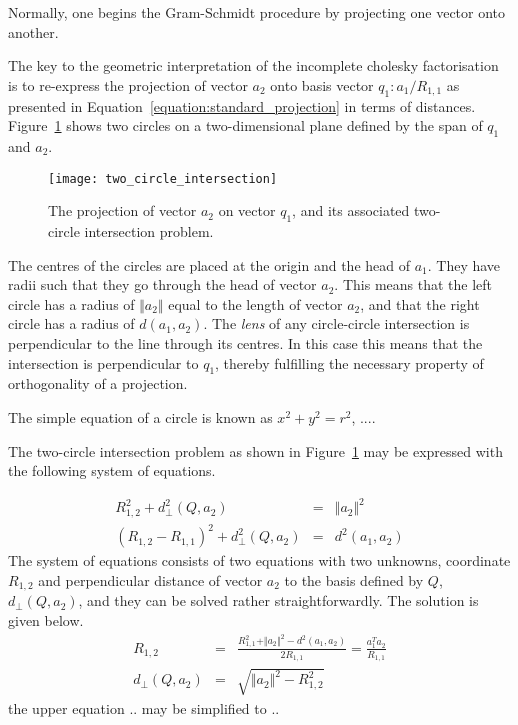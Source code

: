 \documentclass{article}
\newcommand{\sv}{Q}
\newcommand{\sve}{q}
\newcommand{\nonsve}{a}
\newcommand{\ce}{R}
\begin{document}
Normally, one begins the Gram-Schmidt procedure by projecting one
vector onto another. 

The key to the geometric interpretation of the incomplete
cholesky factorisation is to re-express the projection
of vector $\nonsve_{2}$ onto basis vector $\sve_{1}:\nonsve_{1}/\ce_{1,1}$
as presented in Equation~\ref{equation:standard_projection} in terms
of distances. Figure~\ref{figure:two_circle_intersection} shows two circles
on a two-dimensional plane defined by the span of $\sve_{1}$ and
$\nonsve_{2}$. %
\begin{figure}
\begin{center}
\texttt{[image: two\_circle\_intersection]}
\end{center}
\caption{The projection of vector $\nonsve_{2}$ on vector $\sve_{1}$, and
its associated two-circle intersection problem.%
\label{figure:two_circle_intersection}}
\end{figure}
%
The centres of the circles are placed at the origin and the head
of $\nonsve_{1}$. They have radii such that they go through the head
of vector $\nonsve_{2}$. This means that the left circle has a radius
of $\Vert\nonsve_{2}\Vert$ equal to the length of vector $\nonsve_{2}$,
and that the right circle has a radius of $d(\nonsve_{1},\nonsve_{2})$.
The \emph{lens} of any circle-circle intersection is perpendicular
to the line through its centres. In this case this means that the
intersection is perpendicular to $\sve_{1}$, thereby fulfilling the
necessary property of orthogonality of a projection. 

The simple equation of a circle is known as $x^{2}+y^{2}=r^{2}$,
.... 

The two-circle intersection problem as shown in Figure~\ref{figure:two_circle_intersection}
may be expressed with the following system of equations. 

\begin{eqnarray*}
\ce_{1,2}^{2}+d_{\perp}^{2}(\sv,\nonsve_{2}) & = & \Vert\nonsve_{2}\Vert^{2}\\
(\ce_{1,2}-\ce_{1,1})^{2}+d_{\perp}^{2}(\sv,\nonsve_{2}) & = & d^{2}(\nonsve_{1},\nonsve_{2})\end{eqnarray*}
The system of equations consists of two equations with two unknowns,
coordinate $\ce_{1,2}$ and perpendicular distance of vector $\nonsve_{2}$
to the basis defined by $\sv$, $d_{\perp}(\sv,\nonsve_{2})$, and
they can be solved rather straightforwardly. The solution is given
below. \begin{eqnarray*}
\ce_{1,2} & = & \frac{\ce_{1,1}^{2}+\Vert\nonsve_{2}\Vert^{2}-d^{2}(\nonsve_{1},\nonsve_{2})}{2\ce_{1,1}}=\frac{\nonsve_{1}^{T}\nonsve_{2}}{\ce_{1,1}}\\
d_{\perp}(\sv,\nonsve_{2}) & = & \sqrt{\Vert\nonsve_{2}\Vert^{2}-\ce_{1,2}^{2}}\end{eqnarray*}
the upper equation .. may be simplified to .. 
\end{document}

